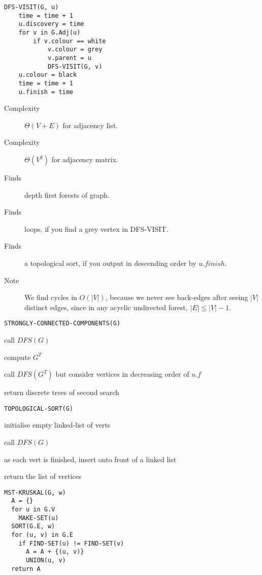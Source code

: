 \documentclass[10pt, a4paper,landscape]{article}
\begin{document}
\begin{multicols*}{4}
\begin{lstlisting}
DFS-VISIT(G, u)
    time = time + 1
    u.discovery = time
    for v in G.Adj(u)
        if v.colour == white
            v.colour = grey
            v.parent = u
            DFS-VISIT(G, v)
    u.colour = black
    time = time + 1
    u.finish = time
\end{lstlisting}
\begin{description}
    \item[Complexity] $\Theta(V+E)$ for adjacency list.
    \item[Complexity] $\Theta(V^2)$ for adjacency matrix.
    \item[Finds] depth first forests of graph.
    \item[Finds] loops, if you find a grey vertex in DFS-VISIT.
    \item[Finds] a topological sort, if you output in descending order by $u.finish$.
    \item[Note] We find cycles in $O(|V|)$, because we never see back-edges after seeing $|V|$ distinct edges, since in any acyclic undirected forest, $|E| \leq |V| - 1$. 
\end{description}

\begin{lstlisting}
STRONGLY-CONNECTED-COMPONENTS(G)
\end{lstlisting}
\begin{compactitem}
    \item call $DFS(G)$
    \item compute $G^T$
    \item call $DFS(G^T)$ but consider vertices in
        decreasing order of $u.f$
    \item return discrete trees of second search
\end{compactitem}

\begin{lstlisting}
TOPOLOGICAL-SORT(G)
\end{lstlisting}
\begin{compactitem}
    \item initialise empty linked-list of verts
    \item call $DFS(G)$
    \item as each vert is finished, insert onto front of a linked list
    \item return the list of vertices
\end{compactitem}

\begin{lstlisting}
MST-KRUSKAL(G, w)
  A = {}
  for u in G.V
    MAKE-SET(u)
  SORT(G.E, w)
  for (u, v) in G.E
    if FIND-SET(u) != FIND-SET(v)
      A = A + {(u, v)}
      UNION(u, v)
  return A


\end{lstlisting}
\end{multicols*}
\end{document}
